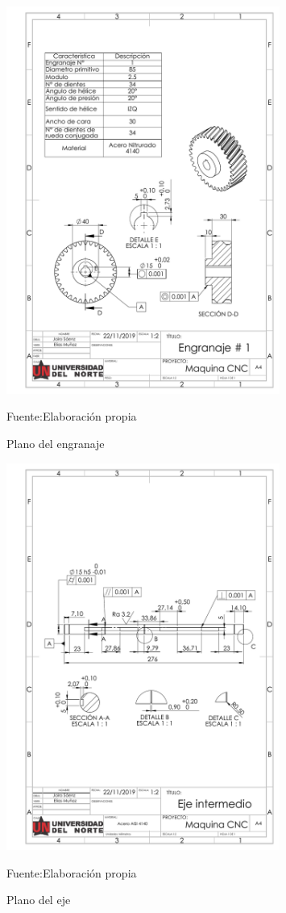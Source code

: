 \begin{figure}[ht!]
    \centering
    \includegraphics[width =0.8\textwidth]{Cap5_DisenoDetallado/Figuras/engranaje_1.PDF}
    \caption{Plano del engranaje}{Fuente:Elaboración propia}
    \label{fig:Planos_engranaje}
\end{figure}
\newpage
\begin{figure}[ht!]
    \centering
    \includegraphics[width =0.8\textwidth]{Cap5_DisenoDetallado/Figuras/eje2.PDF}
    \caption{Plano del eje}{Fuente:Elaboración propia}
    \label{fig:Planos_eje}
\end{figure}
